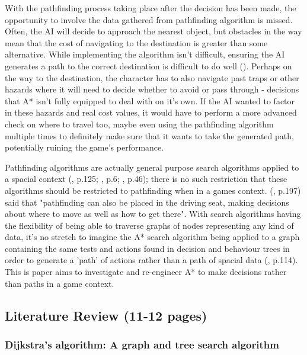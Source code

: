 \documentclass[11pt, a4paper]{article}
\begin{document}
With the pathfinding process taking place after the decision has been made, the opportunity to involve the data gathered from pathfinding algorithm is missed. Often, the AI will decide to approach the nearest object, but obstacles in the way mean that the cost of navigating to the destination is greater than some alternative. While implementing the algorithm isn't difficult, ensuring the AI generates a path to the correct destination is difficult to do well (\cite{forbus2002qualitative}). Perhaps on the way to the destination, the character has to also navigate past traps or other hazards where it will need to decide whether to avoid or pass through - decisions that A* isn't fully equipped to deal with on it's own. If the AI wanted to factor in these hazards and real cost values, it would have to perform a more advanced check on where to travel too, maybe even using the pathfinding algorithm multiple times to definitely make sure that it wants to take the generated path, potentially ruining the game's performance.

Pathfinding algorithms are actually general purpose search algorithms applied to a spacial context (\cite{cui2011based}, p.125; \cite{orkin2003applying}, p.6; \cite{yap2002grid}, p.46); there is no such restriction that these algorithms should be restricted to pathfinding when in a games context. \citeauthor{millington2019ai} (\citeyear{millington2019ai}, p.197) said that "pathfinding can also be placed in the driving seat, making decisions about where to move as well as how to get there". With search algorithms having the flexibility of being able to traverse graphs of nodes representing any kind of data, it's no stretch to imagine the A* search algorithm being applied to a graph containing the same tests and actions found in decision and behaviour trees in order to generate a 'path' of actions rather than a path of spacial data (\cite{higgins2002generic}, p.114). This is paper aims to investigate and re-engineer A* to make decisions rather than paths in a game context.

\subsection{Literature Review (11-12 pages)}

\subsubsection{Dijkstra's algorithm: A graph and tree search algorithm}
\end{document}
